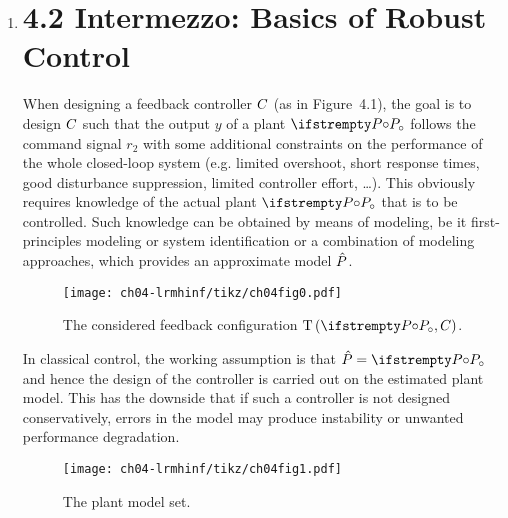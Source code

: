 \documentclass{responseletter}
\begin{document}
\begin{enumerate}
  \item 
  \begin{newquote}
  \section{4.2 Intermezzo: Basics of Robust Control}
\label{sec:lrmhinf:robust-control-basics}
When designing a feedback controller $C$ (as in Figure~4.1), the goal is to design $C$ such that the output $y$ of a plant $\true{\Plant}$ follows the command signal $r_2$ with some additional constraints on the performance of the whole closed-loop system (e.g. limited overshoot, short response times, good disturbance suppression, limited controller effort, \ldots).
This obviously requires knowledge of the actual plant $\true{\Plant}$ that is to be controlled.
Such knowledge can be obtained by means of modeling, be it first-principles modeling or system identification or a combination of modeling approaches, which provides an approximate model $\hat{P}$.

\begin{figure}
 \centering
 \texttt{[image: ch04-lrmhinf/tikz/ch04fig0.pdf]}
 \caption[4.1]{The considered feedback configuration $\ClosedLoop{\true{\Plant},\Controller}$.}
 \label{fig:lrmhinf:tpc:nominal}
\end{figure}

In classical control, the working assumption is that $\estimated{\Plant} = \true{\Plant}$ and hence the design of the controller is carried out on the estimated plant model.
This has the downside that if such a controller is not designed conservatively, errors in the model may produce instability or unwanted performance degradation.

\begin{figure}%
  \centering
  \texttt{[image: ch04-lrmhinf/tikz/ch04fig1.pdf]}
  \caption[4.2]{The plant model set.}
  \label{fig:lrmhinf:modelset}
\end{figure}


\end{newquote}
\end{enumerate}
\end{document}
